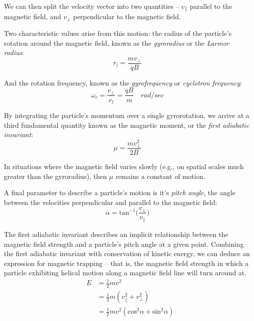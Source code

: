 We can then split the velocity vector into two quantities -- $v_\parallel$ parallel to the magnetic field, and $v_\perp$ perpendicular to the magnetic field.

Two characteristic values arise from this motion: the radius of the particle's rotation around the magnetic field, known as the \emph{gyroradius} or the \emph{Larmor radius}:
\begin{equation}
r_l = \frac{m v_\perp}{qB}
\end{equation}

And the rotation frequency, known as the \emph{gyrofrequency} or \emph{cyclotron frequency}:
\begin{equation}
\omega_c = \frac{v_\perp}{r_l} = \frac{q B}{m} \quad \unit{rad/sec}
\end{equation}

By integrating the particle's momentum over a single gyrorotation, we arrive at a third fundamental quantity known as the magnetic moment, or the \emph{first adiabatic invariant}:
\begin{equation}
\mu = \frac{m v_\perp^2}{2B}
\label{eqn:mu}
\end{equation}

In situations where the magnetic field varies slowly (e.g., on spatial scales much greater than the gyroradius), then $\mu$ remains a constant of motion.

A final parameter to describe a particle's motion is it's \emph{pitch angle}, the angle between the velocities perpendicular and parallel to the magnetic field:
\begin{equation}
\alpha = \mathrm{tan}^{-1}\bigg(\frac{v_\perp}{v_\parallel}\bigg)
\end{equation}

The first adiabatic invariant describes an implicit relationship between the magnetic field strength and a particle's pitch angle at a given point. 
Combining the first adiabatic invariant with conservation of kinetic energy, we can deduce an expression for magnetic trapping -- that is, the magnetic field strength in which a particle exhibiting helical motion along a magnetic field line will turn around at. 
\begin{eqnarray}
& E &= \frac{1}{2}mv^2 \\
& &= \frac{1}{2}m(v_\parallel^2 + v_\perp^2) \\
 & &= \frac{1}{2}mv^2(\mathrm{cos}^2\alpha + \mathrm{sin}^2\alpha)
\end{eqnarray}

